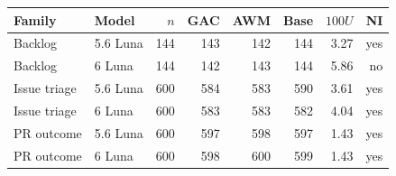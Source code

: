 \begin{tabular}{llrrrrrr}
\toprule
Family & Model & $n$ & GAC & AWM & Base & $100U$ & NI \\
\midrule
Backlog & 5.6 Luna & 144 & 143 & 142 & 144 & 3.27 & yes \\
Backlog & 6 Luna & 144 & 142 & 143 & 144 & 5.86 & no \\
Issue triage & 5.6 Luna & 600 & 584 & 583 & 590 & 3.61 & yes \\
Issue triage & 6 Luna & 600 & 583 & 583 & 582 & 4.04 & yes \\
PR outcome & 5.6 Luna & 600 & 597 & 598 & 597 & 1.43 & yes \\
PR outcome & 6 Luna & 600 & 598 & 600 & 599 & 1.43 & yes \\
\bottomrule
\end{tabular}
